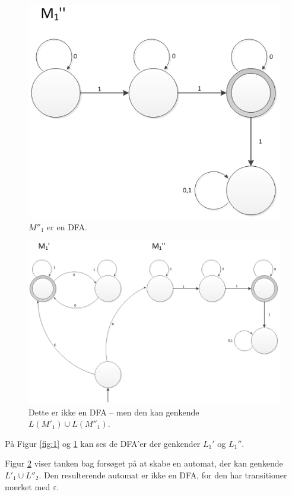\documentclass[a4paper,10pt,article]{memoir}
\begin{document}
\begin{figure}[h]
\centering
\includegraphics[scale=0.8]{figur2.png}
\caption{$M''_1$ er en DFA.}
\label{fig:2}
\end{figure}

\begin{figure}[h]
\centering
\includegraphics[scale=0.6]{figur3.png}
\caption{Dette er ikke en DFA -- men den kan genkende $L(M'_1) \cup L(M''_1)$.}
\label{fig:3}
\end{figure}

På Figur \ref{fig:1} og \ref{fig:2} kan ses de DFA'er der genkender $L_1'$ og $L_1''$.

Figur \ref{fig:3} viser tanken bag forsøget på at skabe en automat, der kan genkende $L'_1 \cup L''_2$. Den resulterende automat er ikke en DFA, for den har transitioner mærket med $\varepsilon$. 
\end{document}

